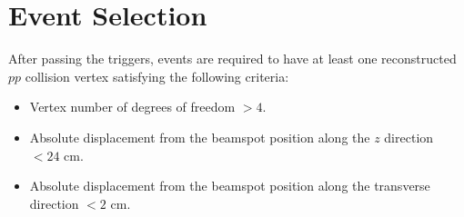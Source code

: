 


\section{Event Selection}
\label{sec:EvtSel}


After passing the triggers, events are required to have at least one reconstructed $pp$ collision vertex satisfying the following criteria:
\begin{itemize}
  \item Vertex number of degrees of freedom $> 4$.
  \item Absolute displacement from the beamspot position along the $z$ direction $< 24$ cm.
  \item Absolute displacement from the beamspot position along the transverse direction $< 2$ cm.
\end{itemize}


